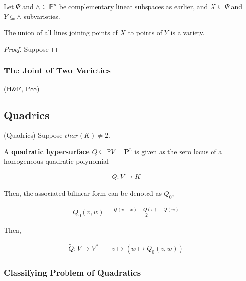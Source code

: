 \documentclass[Total.tex]{subfiles}
\begin{document}
		\begin{proposition}
			Let $\Psi$ and $\wedge\subseteq \mathbb{P}^n$ be complementary linear subspaces as earlier, and $X\subseteq \Psi$ and $Y\subseteq \wedge$ subvarieties. 
			
			The union of all lines joining points of $X$ to points of $Y$ is a variety.
		\end{proposition}
		
		\begin{proof}
			Suppose 
		\end{proof}
		
		\subsubsection{The Joint of Two Varieties}
		
		\begin{Def}
			(H\&F, P88) 
		\end{Def}
		
		
		
		\subsection{Quadrics}
		
		\begin{example}
			(Quadrics) Suppose $char(K)\not=2$.
			
			\begin{Def}
				A \textbf{quadratic hypersurface} $Q\subseteq \mathbb{P}V=\mathbf{P}^n$ is given as the zero locus of a homogeneous quadratic polynomial
				
				\begin{gather*}
					Q:V\rightarrow K
				\end{gather*}
				
				Then, the associated bilinear form can be denoted as $Q_0$,
				
				\begin{gather*}
					Q_0(v,w)=\frac{Q(v+w)-Q(v)-Q(w)}{2}
				\end{gather*} 
				
				Then,
				
				\begin{gather*}
					\tilde{Q}:V\rightarrow V^*\qquad v\mapsto (w\mapsto Q_0(v,w))
				\end{gather*}
			\end{Def}
		\end{example}
		
		\subsubsection{Classifying Problem of Quadratics}
		
\end{document}
